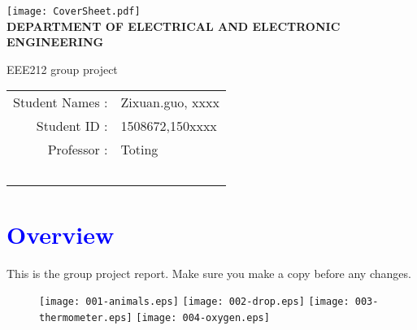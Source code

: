 \documentclass[11pt,english,a4paper]{report}
\begin{document}
	\begin{titlepage}
		\begin{center}
			\texttt{[image: CoverSheet.pdf]}\\
			\bf{DEPARTMENT OF ELECTRICAL AND ELECTRONIC ENGINEERING}
		\end{center}
		\vspace{18mm}
		\begin{center}
			\begin{Large}
				\vspace{2.0cm}
				\LARGE{EEE212 group project}
			\end{Large}
		\end{center}
		\vspace{2.0cm}
		\begin{center}
			\begin{large}
				\vspace{3.0cm}
				\begin{tabular}{r@{ }l}
					Student Names : & Zixuan.guo, xxxx  \\
					Student ID :   & 1508672,150xxxx    \\
					Professor :    & Toting  \\ \
				\end{tabular}
			\end{large}
		\end{center}
	\end{titlepage}
	
	\tableofcontents
	\newpage
	\renewcommand\thesection{\arabic {section}}
	\section{\textcolor{blue}{\textbf{\Large {Overview}}}}
    This is the group project report. Make sure you make a copy before any changes.
    \begin{figure}[htb]
    \texttt{[image: 001-animals.eps]}
    \texttt{[image: 002-drop.eps]}
    \texttt{[image: 003-thermometer.eps]}
    \texttt{[image: 004-oxygen.eps]}
    \end{figure}

	
	\renewcommand\bibname{References}
	
\end{document}
